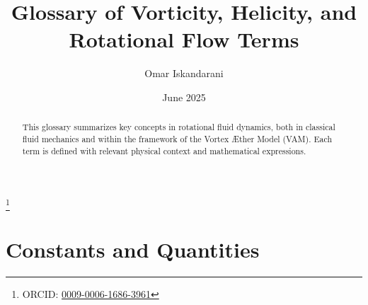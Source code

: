 \documentclass[a4paper, aps,preprint,superscriptaddress, 12pt]{revtex4}
\begin{document}
    \title{Glossary of Vorticity, Helicity, and Rotational Flow Terms}
    \author{Omar Iskandarani}
    \date{June 2025}
    \thanks{ORCID: \href{https://orcid.org/0009-0006-1686-3961}{0009-0006-1686-3961}}

    \begin{abstract}
        This glossary summarizes key concepts in rotational fluid dynamics, both in classical fluid mechanics and within the framework of the Vortex \AE{}ther Model (VAM). Each term is defined with relevant physical context and mathematical expressions.
    \end{abstract}

    \maketitle

    \section*{Constants and Quantities}
    \small%
\end{document}
